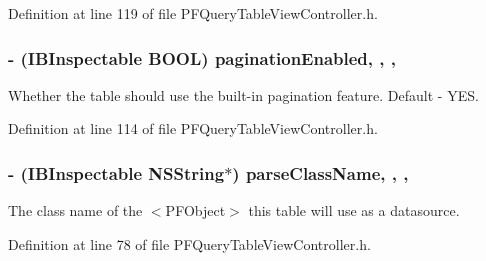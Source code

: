 Definition at line 119 of file P\+F\+Query\+Table\+View\+Controller.\+h.

\hypertarget{interface_p_f_query_table_view_controller_aafceccf00447e9f7e1d8db2faf4e8c76}{}
\subsubsection[{pagination\+Enabled}]{\setlength{\rightskip}{0pt plus 5cm}-\/ (I\+B\+Inspectable B\+O\+O\+L) pagination\+Enabled\hspace{0.3cm}{\ttfamily [read]}, {\ttfamily [write]}, {\ttfamily [nonatomic]}, {\ttfamily [assign]}}\label{interface_p_f_query_table_view_controller_aafceccf00447e9f7e1d8db2faf4e8c76}
Whether the table should use the built-\/in pagination feature. Default -\/ {\ttfamily Y\+E\+S}. 

Definition at line 114 of file P\+F\+Query\+Table\+View\+Controller.\+h.

\hypertarget{interface_p_f_query_table_view_controller_aaae6bcb41e59355b0bbf91a524bfc714}{}
\subsubsection[{parse\+Class\+Name}]{\setlength{\rightskip}{0pt plus 5cm}-\/ (I\+B\+Inspectable N\+S\+String$\ast$) parse\+Class\+Name\hspace{0.3cm}{\ttfamily [read]}, {\ttfamily [write]}, {\ttfamily [nonatomic]}, {\ttfamily [copy]}}\label{interface_p_f_query_table_view_controller_aaae6bcb41e59355b0bbf91a524bfc714}
The class name of the $<$\+P\+F\+Object$>$ this table will use as a datasource. 

Definition at line 78 of file P\+F\+Query\+Table\+View\+Controller.\+h.

\hypertarget{interface_p_f_query_table_view_controller_a6e435ec43463857e02845f37174a342b}{}
